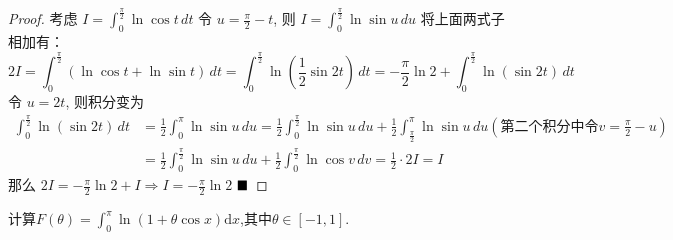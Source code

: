 \documentclass[lang=cn,newtx,10pt,scheme=chinese]{elegantbook}
\begin{document}
\begin{proof}
    考虑 $I = \int_0^{\frac{\pi}{2}} \ln \cos t \, dt$
    令 $u = \frac{\pi}{2} - t$, 则 $I = \int_0^{\frac{\pi}{2}} \ln \sin u \, du$
    将上面两式子相加有：
    $$2I = \int_0^{\frac{\pi}{2}} (\ln \cos t + \ln \sin t) \, dt = \int_0^{\frac{\pi}{2}} \ln (\frac{1}{2} \sin 2t) \, dt = -\frac{\pi}{2}\ln 2 + \int_0^{\frac{\pi}{2}} \ln (\sin 2t) \, dt$$
    令 $u = 2t$, 则积分变为 
    \begin{align*}
    \int_0^{\frac{\pi}{2}} \ln (\sin 2t) \, dt &= \frac{1}{2} \int_0^\pi \ln \sin u \, du =  \frac{1}{2} \int_0^{\frac{\pi}{2}} \ln \sin u \, du + \frac{1}{2} \int_{\frac{\pi}{2}}^{\pi} \ln \sin u \, du (\text{第二个积分中令}v = \frac{\pi}{2}- u)\\
     &=  \frac{1}{2} \int_0^{\frac{\pi}{2}} \ln \sin u \, du + \frac{1}{2} \int_{0}^{\frac{\pi}{2}} \ln \cos v \, dv =\frac{1}{2} \cdot 2I = I
    \end{align*}
    那么 $2I = -\frac{\pi}{2}\ln 2 + I \Rightarrow I = -\frac{\pi}{2}\ln 2$ $\hfill \blacksquare$
\end{proof}


\begin{example}[$\bigstar$]{\label{ex:integral-parameter_1}}
    计算$F(\theta)= \int_{0}^{\pi} \ln (1+\theta \cos x) \mathrm{d} x$,其中$\theta \in [-1,1]$.
\end{example}
\end{document}
